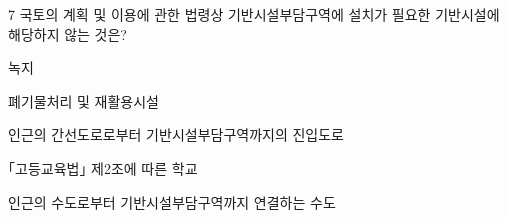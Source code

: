 \begin{question}{7}
국토의 계획 및 이용에 관한 법령상 기반시설부담구역에 설치가 필요한 기반시설에 해당하지 않는 것은?
\begin{choices}
  \item 녹지
  \item 폐기물처리 및 재활용시설
  \item 인근의 간선도로로부터 기반시설부담구역까지의 진입도로
  \item ｢고등교육법｣ 제2조에 따른 학교
  \item 인근의 수도로부터 기반시설부담구역까지 연결하는 수도
\end{choices}
\end{question}
